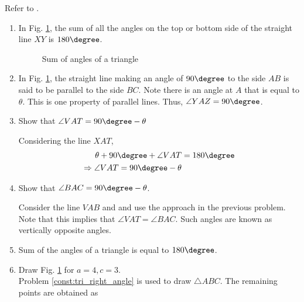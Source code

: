 Refer to .
\begin{enumerate}[label=\thesection.\arabic*.,ref=\thesection.\theenumi]
\item 	In Fig. \ref{fig:tri_sum_angle}, the sum of all the angles on the top or bottom side of the straight line $XY$ is $180\degree$.


\begin{figure}[!ht]
	\begin{center}
		\resizebox{\columnwidth}{!}{}
	\end{center}
	\caption{Sum of angles of a triangle}
	\label{fig:tri_sum_angle}	
\end{figure}



\item
In Fig. \ref{fig:tri_sum_angle}, the straight line making an angle of $90\degree$ to the side $AB$ is said to be parallel to the side $BC$. Note there is an angle at $A$ that is equal to $\theta$.  This is one property of parallel lines.  Thus, $\angle YAZ = 90\degree$.


\item
	Show that $\angle VAT = 90\degree - \theta$
		
	\solution Considering the line $XAT$,
	\begin{align}
	\theta + 90\degree + \angle VAT &= 180\degree \\
	\Rightarrow  \angle VAT =  90\degree - \theta
	\end{align}

\item
	\label{prob:tri_compl_angle}
	Show that $\angle BAC = 90\degree - \theta$.
	
	\solution Consider the line $VAB$ and and use the approach in the previous problem.  Note that this implies that $\angle VAT = \angle BAC$.  Such angles are known as vertically opposite angles. 
	 
\item
Sum of the angles of a triangle is equal to $180\degree$.
%
\iffalse
\item Draw Fig. \ref{fig:tri_sum_angle} for $a = 4, c =3$.
%
\\
\solution Problem \ref{const:tri_right_angle} is used to draw $\triangle ABC$.  
		The remaining points are obtained as


\end{enumerate}
